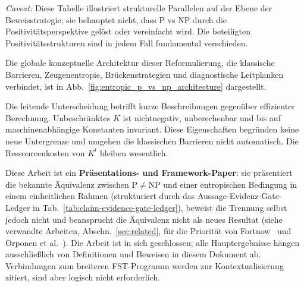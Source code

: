 \documentclass[aps,prd,twocolumn,superscriptaddress,nofootinbib]{revtex4-2}
\theoremstyle{definition}
\theoremstyle{remark}
\newcommand{\NP}{\mathrm{NP}}
\newcommand{\PP}{\mathrm{P}}
\begin{document}
\noindent\textit{Caveat:} Diese Tabelle illustriert strukturelle Parallelen auf der Ebene der Beweisstrategie; sie behauptet nicht, dass P vs NP durch die Positivitätsperspektive gelöst oder vereinfacht wird. Die beteiligten Positivitätsstrukturen sind in jedem Fall fundamental verschieden.

Die globale konzeptuelle Architektur dieser Reformulierung, die klassische Barrieren, Zeugenentropie, Brückenstrategien und diagnostische Leitplanken verbindet, ist in Abb.~\ref{fig:entropic_p_vs_np_architecture} dargestellt.

Die leitende Unterscheidung betrifft kurze Beschreibungen gegenüber effizienter Berechnung. Unbeschränktes $K$ ist nichtnegativ, unberechenbar und bis auf maschinenabhängige Konstanten invariant. Diese Eigenschaften begründen keine neue Untergrenze und umgehen die klassischen Barrieren nicht automatisch. Die Ressourcenkosten von $K^t$ bleiben wesentlich.

Diese Arbeit ist ein \textbf{Präsentations- und Framework-Paper}: sie präsentiert die bekannte Äquivalenz zwischen $\PP \neq \NP$ und einer entropischen Bedingung in einem einheitlichen Rahmen (strukturiert durch das Aussage-Evidenz-Gate-Ledger in Tab.~\ref{tab:claim-evidence-gate-ledger}), beweist die Trennung selbst jedoch nicht und beansprucht die Äquivalenz nicht als neues Resultat (siehe verwandte Arbeiten, Abschn.~\ref{sec:related}, für die Priorität von Fortnow~\cite{Fortnow2000} und Orponen et al.~\cite{OrponenKoSchoeningWatanabe1994}). Die Arbeit ist in sich geschlossen; alle Hauptergebnisse hängen ausschlie\ss{}lich von Definitionen und Beweisen in diesem Dokument ab. Verbindungen zum breiteren FST-Programm werden zur Kontextualisierung zitiert, sind aber logisch nicht erforderlich.
\end{document}
